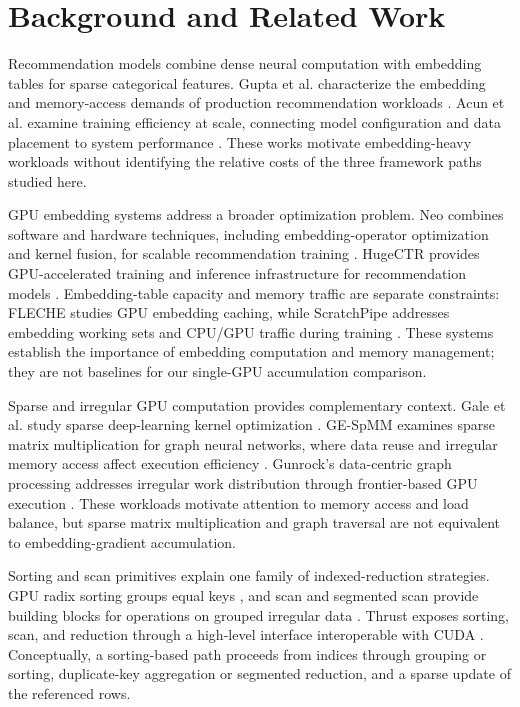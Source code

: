 \section{Background and Related Work}
\label{sec:background-related-work}

Recommendation models combine dense neural computation with embedding tables for sparse categorical features. Gupta et al. characterize the embedding and memory-access demands of production recommendation workloads \citep{gupta2020architectural}. Acun et al. examine training efficiency at scale, connecting model configuration and data placement to system performance \citep{acun2021training}. These works motivate embedding-heavy workloads without identifying the relative costs of the three framework paths studied here.

GPU embedding systems address a broader optimization problem. Neo combines software and hardware techniques, including embedding-operator optimization and kernel fusion, for scalable recommendation training \citep{mudigere2022neo}. HugeCTR provides GPU-accelerated training and inference infrastructure for recommendation models \citep{wang2022hugectr}. Embedding-table capacity and memory traffic are separate constraints: FLECHE studies GPU embedding caching, while ScratchPipe addresses embedding working sets and CPU/GPU traffic during training \citep{xie2022fleche,kwon2022scratchpipe}. These systems establish the importance of embedding computation and memory management; they are not baselines for our single-GPU accumulation comparison.

Sparse and irregular GPU computation provides complementary context. Gale et al. study sparse deep-learning kernel optimization \citep{gale2020sparse}. GE-SpMM examines sparse matrix multiplication for graph neural networks, where data reuse and irregular memory access affect execution efficiency \citep{huang2020gespmm}. Gunrock's data-centric graph processing addresses irregular work distribution through frontier-based GPU execution \citep{wang2016gunrock}. These workloads motivate attention to memory access and load balance, but sparse matrix multiplication and graph traversal are not equivalent to embedding-gradient accumulation.

Sorting and scan primitives explain one family of indexed-reduction strategies. GPU radix sorting groups equal keys \citep{satish2009sorting}, and scan and segmented scan provide building blocks for operations on grouped irregular data \citep{sengupta2007scan}. Thrust exposes sorting, scan, and reduction through a high-level interface interoperable with CUDA \citep{bell2011thrust}. Conceptually, a sorting-based path proceeds from indices through grouping or sorting, duplicate-key aggregation or segmented reduction, and a sparse update of the referenced rows.

